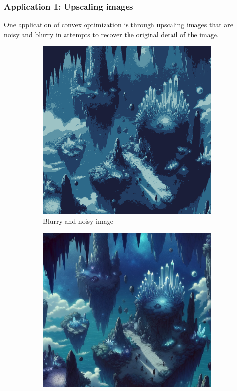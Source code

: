 \subsubsection{Application 1: Upscaling images}
One application of convex optimization is through upscaling images that are noisy and blurry in attempts to recover the original detail of the image.
\begin{figure}[htbp]
  \centering
  \begin{subfigure}[b]{0.49\textwidth}
    \centering
    \includegraphics[width=\textwidth]{images/background_pixellated.png}
    \caption{Blurry and noisy image}
    \label{fig:background_pixellated}
  \end{subfigure}
  \hfill
  \begin{subfigure}[b]{0.49\textwidth}
    \centering
    \includegraphics[width=\textwidth]{images/background_original.png}

\end{subfigure}
\end{figure}
